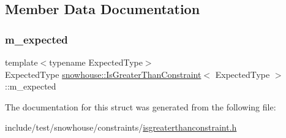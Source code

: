 \subsection{Member Data Documentation}
\mbox{\label{structsnowhouse_1_1IsGreaterThanConstraint_ac32fe63955ecec445be321f99896a28a}} 
\subsubsection{\texorpdfstring{m\_expected}{m\_expected}}
{\footnotesize\ttfamily template$<$typename Expected\+Type$>$ \\
Expected\+Type \mbox{\hyperlink{structsnowhouse_1_1IsGreaterThanConstraint}{snowhouse\+::\+Is\+Greater\+Than\+Constraint}}$<$ Expected\+Type $>$\+::m\+\_\+expected}



The documentation for this struct was generated from the following file\+:\begin{DoxyCompactItemize}
\item 
include/test/snowhouse/constraints/\mbox{\hyperlink{isgreaterthanconstraint_8h}{isgreaterthanconstraint.\+h}}\end{DoxyCompactItemize}
